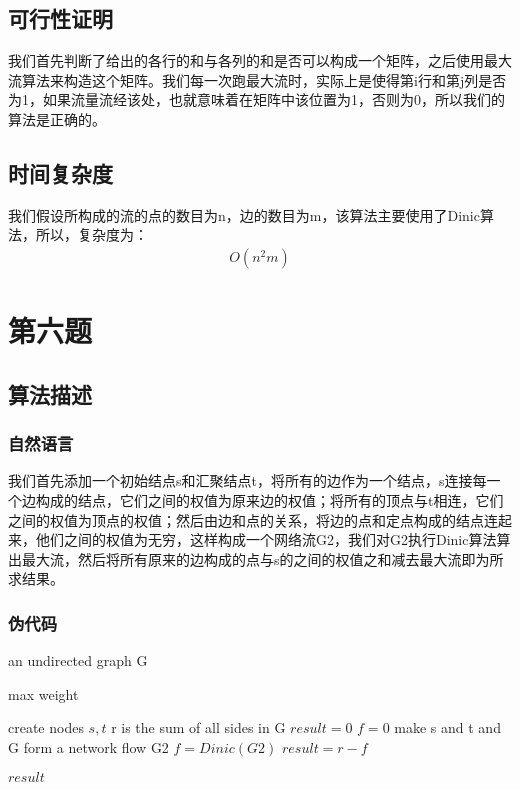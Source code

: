 \documentclass{article}
\begin{document}
		\subsection{可行性证明}
			我们首先判断了给出的各行的和与各列的和是否可以构成一个矩阵，之后使用最大流算法来构造这个矩阵。我们每一次跑最大流时，实际上是使得第i行和第j列是否为1，如果流量流经该处，也就意味着在矩阵中该位置为1，否则为0，所以我们的算法是正确的。
		\subsection{时间复杂度}
		我们假设所构成的流的点的数目为n，边的数目为m，该算法主要使用了Dinic算法，所以，复杂度为：
		\begin{equation*}
			\begin{split}
			O(n^{2}m)
			\end{split}
		\end{equation*}
		
	
	\section{第六题}
	
		\subsection{算法描述}
			
			\subsubsection{自然语言}
			我们首先添加一个初始结点s和汇聚结点t，将所有的边作为一个结点，s连接每一个边构成的结点，它们之间的权值为原来边的权值；将所有的顶点与t相连，它们之间的权值为顶点的权值；然后由边和点的关系，将边的点和定点构成的结点连起来，他们之间的权值为无穷，这样构成一个网络流G2，我们对G2执行Dinic算法算出最大流，然后将所有原来的边构成的点与s的之间的权值之和减去最大流即为所求结果。
			\subsubsection{伪代码}
			\begin{algorithm}
				\begin{algorithmic}
					\Require an undirected graph G 
					
					\Ensure max weight
					
					\State create nodes $s,t$
					\State r is the sum of all sides in G
					\State $result=0$
					\State $f=0$
					\State make s and t and G form a network flow G2
					\State $f=Dinic(G2)$
					\State $result=r-f$
					
					\Return $result$
					\EndFunction
				\end{algorithmic}
			\end{algorithm}
		
\end{document}
